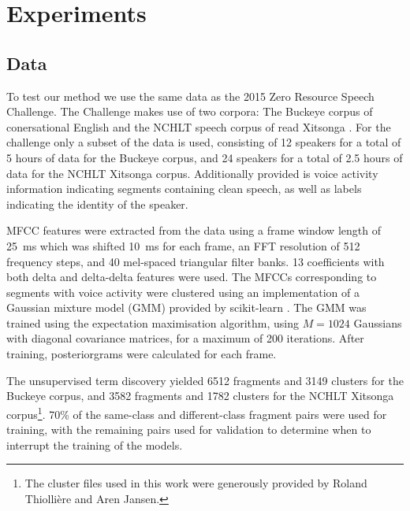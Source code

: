 \section{Experiments}
\label{sec:experiments}

\subsection{Data}
\label{sec:data}

To test our method we use the same data as the 2015 Zero Resource Speech Challenge.
The Challenge makes use of two corpora: The Buckeye corpus of conersational English \parencite{buckeyecorpus} and the NCHLT speech corpus of read Xitsonga \parencite{barnard2014nchlt}.
For the challenge only a subset of the data is used, consisting of 12 speakers for a total of 5 hours of data for the Buckeye corpus, and 24 speakers for a total of 2.5 hours of data for the NCHLT Xitsonga corpus.
Additionally provided is voice activity information indicating segments containing clean speech, as well as labels indicating the identity of the speaker.

MFCC features were extracted from the data using a frame window length of \SI{25}{\ms} which was shifted \SI{10}{\ms} for each frame, an FFT resolution of 512 frequency steps, and 40 mel-spaced triangular filter banks.
13 coefficients with both delta and delta-delta features were used.
The MFCCs corresponding to segments with voice activity were clustered using an implementation of a Gaussian mixture model (GMM) provided by scikit-learn \parencite{scikit-learn}.
The GMM was trained using the expectation maximisation algorithm, using $M = 1024$ Gaussians with diagonal covariance matrices, for a maximum of 200 iterations.
After training, posteriorgrams were calculated for each frame.

The unsupervised term discovery yielded 6512 fragments and 3149 clusters for the Buckeye corpus, and 3582 fragments and 1782 clusters for the NCHLT Xitsonga corpus\footnote{The cluster files used in this work were generously provided by Roland Thiollière and Aren Jansen.}.
70\% of the same-class and different-class fragment pairs were used for training, with the remaining pairs used for validation to determine when to interrupt the training of the models.


